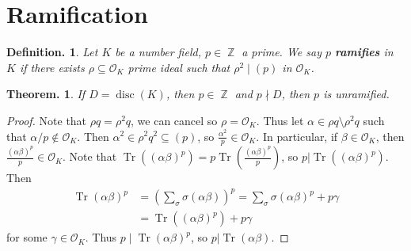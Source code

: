 \documentclass[11pt, a4paper]{memoir}
\DeclareMathOperator{\Z}{{\mathbb{Z}}}
\theoremstyle{change}
\newtheorem{theorem}{Theorem.}[section]
\theoremstyle{plain}
\theoremstyle{nonumberplain}
\newtheorem{definition}{Definition.}
\newtheorem{proof}{Proof}
\DeclareMathOperator{\disc}{disc}
\DeclareMathOperator{\Tr}{Tr}
\begin{document}
\section{Ramification}
\begin{definition}
    Let $K$ be a number field, $p\in\Z$ a prime.
    We say $p$ \textbf{ramifies} in $K$ if there exists $\rho\subseteq\mathcal{O}_K$ prime ideal such that $\rho^2\mid(p)$ in $\mathcal{O}_K$.
\end{definition}
\begin{theorem}
    If $D=\disc(K)$, then $p\in\Z$ and $p\nmid D$, then $p$ is unramified.
\end{theorem}
\begin{proof}
    Note that $\rho q=\rho^2q$, we can cancel so $\rho=\mathcal{O}_K$.
    Thus let $\alpha\in\rho q\setminus\rho^2 q$ such that $\alpha/p\notin\mathcal{O}_K$.
    Then $\alpha^2\in\rho^2 q^2\subseteq(p)$, so $\frac{\alpha^2}{p}\in\mathcal{O}_K$.
    In particular, if $\beta\in\mathcal{O}_K$, then $\frac{(\alpha\beta)^p}{p}\in\mathcal{O}_K$.
    Note that $\Tr((\alpha\beta)^p)=p\Tr\left(\frac{(\alpha\beta)^p}{p}\right)$, so $p|\Tr((\alpha\beta)^p)$.
    Then
    \begin{align*}
        \Tr(\alpha\beta)^p &=\left(\sum_\sigma\sigma(\alpha\beta)\right)^p=\sum_\sigma\sigma(\alpha\beta)^p+p\gamma\\
                           &= \Tr((\alpha\beta)^p)+p\gamma
    \end{align*}
    for some $\gamma\in\mathcal{O}_K$.
    Thus $p\mid\Tr(\alpha\beta)^p$, so $p|\Tr(\alpha\beta)$.


\end{proof}
\end{document}
